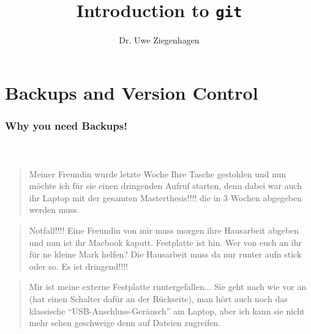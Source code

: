 \documentclass[12pt,ngerman]{beamer}
\title{Introduction to \texttt{git}}
\author{Dr. Uwe Ziegenhagen}
\institute{\url{www.uweziegenhagen.de}}
\begin{document}
\begin{frame}

\maketitle

\end{frame}

\begin{frame}

\tableofcontents

\end{frame}

\section{Backups and Version Control}

\begin{frame}[allowframebreaks]
\frametitle{Why you need Backups!}
\framesubtitle{~}

\vspace*{1em}
\begin{quote}
Meiner Freundin wurde letzte Woche Ihre Tasche gestohlen und nun möchte ich für sie einen dringenden Aufruf starten, denn dabei war auch ihr Laptop mit der gesamten Masterthesis!!!! die in 3 Wochen abgegeben werden muss. 
\end{quote}

\vspace*{1em}
\begin{quote}
Notfall!!!! Eine Freundin von mir muss morgen ihre Hausarbeit abgeben und nun ist ihr Macbook kaputt. Festplatte ist hin. Wer von euch an ihr für ne kleine Mark helfen? Die Hausarbeit muss da nur runter aufn stick oder so. Es ist dringend!!!! 
\end{quote}

\vspace*{1em}
\begin{quote}
Mir ist meine externe Festplatte runtergefallen...  Sie geht nach wie vor an (hat einen Schalter dafür an der Rückseite), man hört auch noch das klassische \enquote{USB-Anschluss-Geräusch} am Laptop, aber ich kann sie nicht mehr sehen geschweige denn auf Dateien zugreifen.
\end{quote}

\end{frame}
\end{document}
